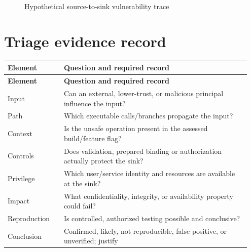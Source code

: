 \documentclass[11pt,letterpaper,oneside]{book}
\begin{document}
\begin{figure}[htbp]\centering
{}\caption{Hypothetical source-to-sink vulnerability trace}\end{figure}

\section{Triage evidence record}

\small
\setlength{\tabcolsep}{2pt}
\renewcommand{\arraystretch}{1.18}
\begin{longtable}{>{\raggedright\arraybackslash}p{0.22\linewidth}>{\raggedright\arraybackslash}p{0.73\linewidth}}
\toprule
\textbf{Element} & \textbf{Question and required record}\\
\midrule
\endfirsthead
\toprule
\textbf{Element} & \textbf{Question and required record}\\
\midrule
\endhead
Input & Can an external, lower-trust, or malicious principal influence the input?\\
Path & Which executable calls/branches propagate the input?\\
Context & Is the unsafe operation present in the assessed build/feature flag?\\
Controls & Does validation, prepared binding or authorization actually protect the sink?\\
Privilege & Which user/service identity and resources are available at the sink?\\
Impact & What confidentiality, integrity, or availability property could fail?\\
Reproduction & Is controlled, authorized testing possible and conclusive?\\
Conclusion & Confirmed, likely, not reproducible, false positive, or unverified; justify\\
\bottomrule
\end{longtable}
\normalsize
\end{document}
